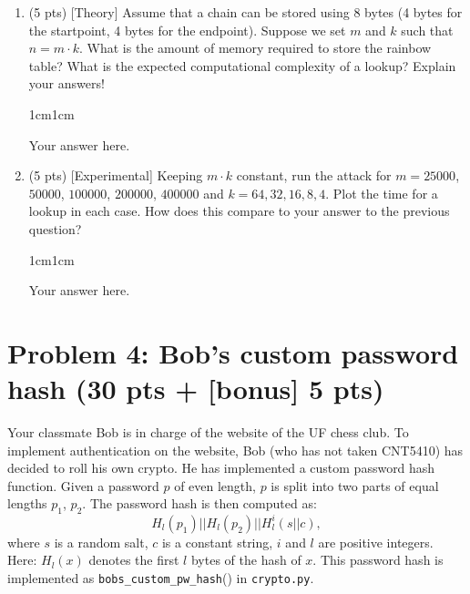 \documentclass[11pt,letterpaper]{article}
\newenvironment{answer}{\em \color{blue} \begin{adjustwidth}{1cm}{1cm}}{\end{adjustwidth}}
\begin{document}
\begin{enumerate}
	\begin{answer}
	
		Your answer here.
		
	\end{answer}
	
	\item (5 pts) [Theory] Assume that a chain can be stored using 8 bytes (4 bytes for the startpoint, 4 bytes for the endpoint). Suppose we set $m$ and $k$ such that $n = m \cdot k$. What is the amount of memory required to store the rainbow table? What is the expected computational complexity of a lookup? Explain your answers!
	
	\begin{answer}
	
		Your answer here.
		
	\end{answer}
	
	\item (5 pts) [Experimental] Keeping $m \cdot k$ constant, run the attack for $m = 25000$, $50000$, $100000$, $200000$, $400000$ and $k = 64, 32, 16, 8, 4$. Plot the time for a lookup in each case. How does this compare to your answer to the previous question?
	
	\begin{answer}
	
	
		Your answer here.
		
	\end{answer}
	
\end{enumerate}

\section*{Problem 4: Bob's custom password hash (30 pts + [bonus] 5 pts)}
%

Your classmate Bob is in charge of the website of the UF chess club. To implement authentication on the website, Bob (who has not taken CNT5410) has decided to roll his own crypto. He has implemented a custom password hash function. Given a password $p$ of even length, $p$ is split into two parts of equal lengths $p_1$, $p_2$. The password hash is then computed as:
\[ H_l(p_1) || H_l(p_2) || H_l^i(s || c) , \]
where $s$ is a random salt, $c$ is a constant string, $i$ and $l$ are positive integers. Here: $H_l(x)$ denotes the first $l$ bytes of the hash of $x$. This password hash is implemented as \texttt{bobs\_custom\_pw\_hash}() in \texttt{crypto.py}.
\end{document}
